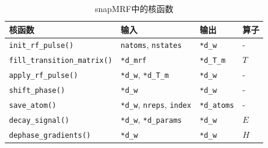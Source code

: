 \begin{table}
\centering
\caption{snapMRF中的核函数}
\begin{center}
\begin{tabular}{|l|l|l|l|}
\hline
\hline
核函数 & 输入 & 输出 & 算子\\
\hline
\texttt{init\_rf\_pulse()} & \texttt{natoms}, \texttt{nstates} & \texttt{*d\_w} & - \\
\hline
\texttt{fill\_transition\_matrix()} & \texttt{*d\_mrf} & \texttt{*d\_T\_m} & $T$ \\
\hline
\texttt{apply\_rf\_pulse()} & \texttt{*d\_w}, \texttt{*d\_T\_m} & \texttt{*d\_w} & - \\
\hline
\texttt{shift\_phase()} & \texttt{*d\_w} & \texttt{*d\_w} & - \\
\hline
\texttt{save\_atom()} & \texttt{*d\_w}, \texttt{nreps}, \texttt{index} & \texttt{*d\_atoms} & - \\
\hline
\texttt{decay\_signal()} & \texttt{*d\_w}, \texttt{*d\_params} & \texttt{*d\_w}  & $E$ \\
\hline
\texttt{dephase\_gradients()} & \texttt{*d\_w} & \texttt{*d\_w} & $H$ \\
\hline
\end{tabular}
\end{center}
\label{tab:kernel}
\end{table}

